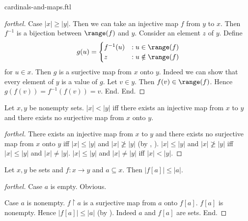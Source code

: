 \documentclass{naproche-library}
\begin{document}
\begin{smodule}{cardinals-and-maps.ftl}
\begin{proof}[forthel]
    Case $|x| \geq |y|$.
      Then we can take an injective map $f$ from $y$ to $x$.
      Then $f^{-1}$ is a bijection between $\range(f)$ and $y$.
      Consider an element $z$ of $y$.
      Define \[ g(u) =
        \begin{cases}
          f^{-1}(u) & : u \in \range(f) \\
          z         & : u \notin \range(f)
        \end{cases} \]
      for $u \in x$.
      Then $g$ is a surjective map from $x$ onto $y$.
      Indeed we can show that every element of $y$ is a value of $g$.
        Let $v \in y$.
        Then $f(v) \in \range(f)$.
        Hence $g(f(v)) = f^{-1}(f(v)) = v$.
      End.
    End.
  \end{proof}

  \begin{proposition}[forthel,id=SET_THEORY_06_5843717288099840,printid]
    Let $x, y$ be nonempty sets.
    $|x| < |y|$ iff there exists an injective map from $x$ to $y$ and there exists no surjective map from $x$ onto $y$.
  \end{proposition}
  \begin{proof}[forthel]
    There exists an injective map from $x$ to $y$ and there exists no surjective map from $x$ onto $y$ iff $|x| \leq |y|$ and $|x| \ngeq |y|$ (by , ).
    $|x| \leq |y|$ and $|x| \ngeq |y|$ iff $|x| \leq |y|$ and $|x| \neq |y|$.
    $|x| \leq |y|$ and $|x| \neq |y|$ iff $|x| < |y|$.
  \end{proof}

  \begin{proposition}[forthel,id=SET_THEORY_06_8113916590686208,printid]
    Let $x, y$ be sets and $f : x \to y$ and $a \subseteq x$.
    Then $|f[a]| \leq |a|$.
  \end{proposition}
  \begin{proof}[forthel]
    Case $a$ is empty. Obvious.

    Case $a$ is nonempty.
      $f \restriction a$ is a surjective map from $a$ onto $f[a]$.
      $f[a]$ is nonempty.
      Hence $|f[a]| \leq |a|$ (by ).
      Indeed $a$ and $f[a]$ are sets.
    End.
  \end{proof}
\end{smodule}
\end{document}
